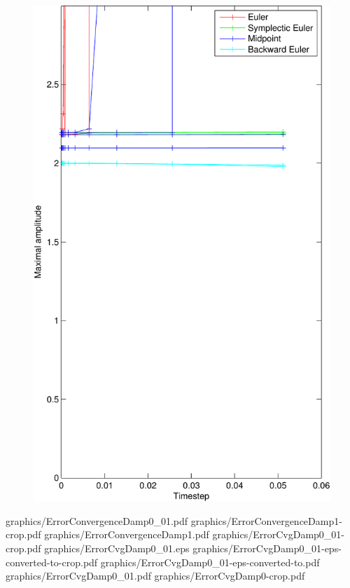 \begin{figure}[]
	\begin{center}
		\includegraphics*[width=\textwidth]{graphics/StabilityDamp1_9-crop.pdf}
	\end{center}
	\caption{}
	\label{fig:}
\end{figure}
graphics/ErrorConvergenceDamp0_01.pdf
graphics/ErrorConvergenceDamp1-crop.pdf
graphics/ErrorConvergenceDamp1.pdf
graphics/ErrorCvgDamp0_01-crop.pdf
graphics/ErrorCvgDamp0_01.eps
graphics/ErrorCvgDamp0_01-eps-converted-to-crop.pdf
graphics/ErrorCvgDamp0_01-eps-converted-to.pdf
graphics/ErrorCvgDamp0_01.pdf
graphics/ErrorCvgDamp0-crop.pdf
